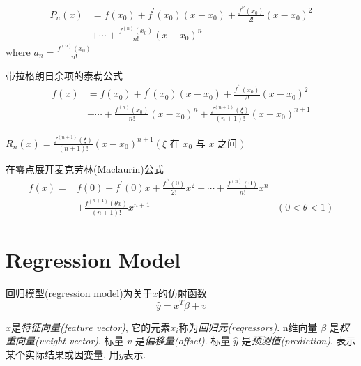 \begin{corollary}[n阶泰勒多项式]
    $$ \begin{aligned} P_{n}(x) &=f\left(x_{0}\right)+f^{\prime}\left(x_{0}\right)\left(x-x_{0}\right)+\frac{f^{\prime \prime}\left(x_{0}\right)}{2 !}\left(x-x_{0}\right)^{2} \\ &+\cdots+\frac{f^{(n)}\left(x_{0}\right)}{n !}\left(x-x_{0}\right)^{n} \end{aligned} $$
    where $a_{n}=\frac{f^{(n)}\left(x_{0}\right)}{n !} $
\end{corollary}

\begin{corollary}[对于高阶余项的公式]
    带拉格朗日余项的泰勒公式
    $$ \begin{aligned} f(x) &=f\left(x_{0}\right)+f^{\prime}\left(x_{0}\right)\left(x-x_{0}\right)+\frac{f^{\prime \prime}\left(x_{0}\right)}{2 !}\left(x-x_{0}\right)^{2} \\ &+\cdots+\frac{f^{(n)}\left(x_{0}\right)}{n !}\left(x-x_{0}\right)^{n}+\frac{f^{(n+1)}(\xi)}{(n+1) !}\left(x-x_{0}\right)^{n+1} \end{aligned} $$

    $ R_{n}(x)=\frac{f^{(n+1)}(\xi)}{(n+1) !}\left(x-x_{0}\right)^{n+1}\left(\xi\right. $ 在 $ x_{0} $ 与 $ x  $ 之间 $ ) $
\end{corollary}

\begin{corollary}在零点展开麦克劳林(Maclaurin)公式
    $$ \begin{aligned} f(x)=& f(0)+f^{\prime}(0) x+\frac{f^{\prime \prime}(0)}{2 !} x^{2}+\cdots+\frac{f^{(n)}(0)}{n !} x^{n} \\ &+\frac{f^{(n+1)}(\theta x)}{(n+1) !} x^{n+1} &(0<\theta<1) \end{aligned} $$
    
\end{corollary}


\section{Regression Model}
\begin{definition}
    回归模型(regression model)为关于$x$的仿射函数
    $$ \hat{y}=x^{T} \beta+v $$

    $x$是\textit{特征向量(feature vector)}, 它的元素$x_i$称为\textit{回归元(regressors)}. n维向量 $ \beta $ 是\textit{权重向量(weight vector)}. 标量 $ v $ 是\textit{偏移量(offset)}. 标量 $ \hat{y} $ 是\textit{预测值(prediction)}. 表示某个实际结果或因变量, 用$y$表示. 
\end{definition}

